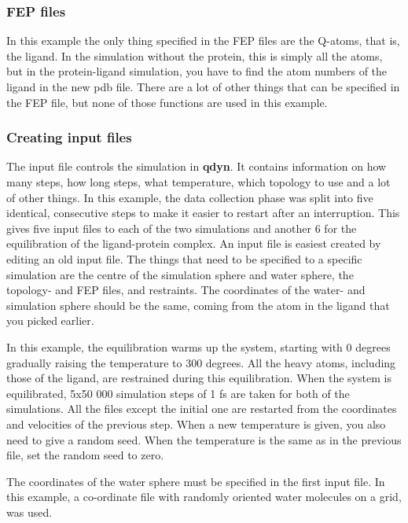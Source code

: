 \documentclass[a4paper,10pt]{article}
\begin{document}
\subsubsection{FEP files}
In this  example the  only thing  specified in the  FEP files  are the
Q-atoms, that is,  the ligand. In the simulation  without the protein,
this is  simply all the  atoms, but in the  protein-ligand simulation,
you  have to  find the  atom  numbers of  the  ligand in  the new  pdb
file. There are a lot of other things that can be specified in the FEP
file, but none of those functions are used in this example.

\subsubsection{Creating input files}
The input file  controls the simulation in  \textbf{qdyn}. It contains
information on how many steps, how long steps, what temperature, which
topology to use and  a lot of other things. In  this example, the data
collection phase was  split into five identical,  consecutive steps to
make it easier to restart after an interruption. This gives five input
files  to  each  of  the  two   simulations  and  another  6  for  the
equilibration of the ligand-protein complex.  An input file is easiest
created  by editing  an old  input file.  The things  that need  to be
specified to  a specific simulation  are the centre of  the simulation
sphere  and   water  sphere,   the  topology-   and  FEP   files,  and
restraints. The coordinates of the water- and simulation sphere should
be  the same,  coming from  the  atom in  the ligand  that you  picked
earlier.

In this example, the equilibration  warms up the system, starting with
0 degrees gradually  raising the temperature to 300  degrees.  All the
heavy atoms, including those of the ligand, are restrained during this
equilibration. When  the system  is equilibrated, 5x50  000 simulation
steps of  1 fs are  taken for both of  the simulations. All  the files
except  the  initial  one  are  restarted  from  the  coordinates  and
velocities of the previous step. When  a new temperature is given, you
also need to give a random seed.   When the temperature is the same as
in the previous file, set the random seed to zero.

The coordinates  of the water  sphere must  be specified in  the first
input file. In this example, a co-ordinate file with randomly oriented
water molecules on a grid, was used.
\end{document}
